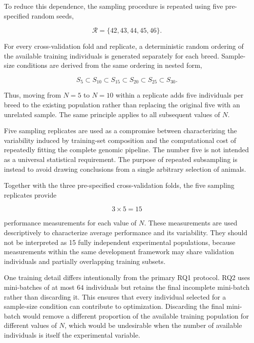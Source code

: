 To reduce this dependence, the sampling procedure is repeated using
five pre-specified random seeds,

\begin{equation}
    \mathcal{R}
    =
    \{42,43,44,45,46\}.
    \label{eq:rq2_replicate_seeds}
\end{equation}

For every cross-validation fold and replicate, a deterministic random
ordering of the available training individuals is generated separately
for each breed. Sample-size conditions are derived from the same
ordering in nested form,

\begin{equation}
S_5
\subset
S_{10}
\subset
S_{15}
\subset
S_{20}
\subset
S_{25}
\subset
S_{30}.
\label{eq:rq2_nested_samples}
\end{equation}

Thus, moving from $N=5$ to $N=10$ within a replicate adds five
individuals per breed to the existing population rather than replacing
the original five with an unrelated sample. The same principle applies
to all subsequent values of $N$.

Five sampling replicates are used as a compromise between
characterizing the variability induced by training-set composition and
the computational cost of repeatedly fitting the complete genomic
pipeline. The number five is not intended as a universal statistical
requirement. The purpose of repeated subsampling is instead to avoid
drawing conclusions from a single arbitrary selection of animals.

Together with the three pre-specified cross-validation folds, the five
sampling replicates provide

\begin{equation}
    3 \times 5 = 15
\end{equation}

performance measurements for each value of $N$. These measurements
are used descriptively to characterize average performance and its
variability. They should not be interpreted as 15 fully independent
experimental populations, because measurements within the same
development framework may share validation individuals and partially
overlapping training subsets.

One training detail differs intentionally from the primary RQ1
protocol. RQ2 uses mini-batches of at most $64$ individuals but retains
the final incomplete mini-batch rather than discarding it. This ensures
that every individual selected for a sample-size condition can
contribute to optimization. Discarding the final mini-batch would
remove a different proportion of the available training population for
different values of $N$, which would be undesirable when the number of
available individuals is itself the experimental variable.

